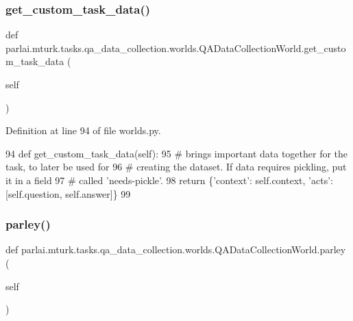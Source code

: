 \subsubsection{\texorpdfstring{get\+\_\+custom\+\_\+task\+\_\+data()}{get\_custom\_task\_data()}}
{\footnotesize\ttfamily def parlai.\+mturk.\+tasks.\+qa\+\_\+data\+\_\+collection.\+worlds.\+Q\+A\+Data\+Collection\+World.\+get\+\_\+custom\+\_\+task\+\_\+data (\begin{DoxyParamCaption}\item[{}]{self }\end{DoxyParamCaption})}



Definition at line 94 of file worlds.\+py.


\begin{DoxyCode}
94     \textcolor{keyword}{def }get\_custom\_task\_data(self):
95         \textcolor{comment}{# brings important data together for the task, to later be used for}
96         \textcolor{comment}{# creating the dataset. If data requires pickling, put it in a field}
97         \textcolor{comment}{# called 'needs-pickle'.}
98         \textcolor{keywordflow}{return} \{\textcolor{stringliteral}{'context'}: self.context, \textcolor{stringliteral}{'acts'}: [self.question, self.answer]\}
99 \end{DoxyCode}
\mbox{\label{classparlai_1_1mturk_1_1tasks_1_1qa__data__collection_1_1worlds_1_1QADataCollectionWorld_a50f26229a3c460bded227df6321d7d8e}} 
\subsubsection{\texorpdfstring{parley()}{parley()}}
{\footnotesize\ttfamily def parlai.\+mturk.\+tasks.\+qa\+\_\+data\+\_\+collection.\+worlds.\+Q\+A\+Data\+Collection\+World.\+parley (\begin{DoxyParamCaption}\item[{}]{self }\end{DoxyParamCaption})}



